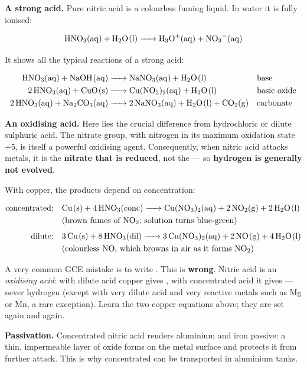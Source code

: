 \documentclass[11pt]{article}
\newcommand{\cle}[1]{{\popxbold\color{popdark}#1}}
\newcounter{popsec}
\newcounter{popsub}
\newcommand{\courssub}[1]{%
  \stepcounter{popsub}%
  \par\vspace{9pt}\noindent{\popxbold\fontsize{11.5}{13}\selectfont\color{popink}{\color{poporange}\thepopsec.\thepopsub}\hspace{6pt}#1}\par\nopagebreak\vspace{4pt}
}
\begin{document}
\courssub{Properties of Nitric Acid}

\textbf{A strong acid.} Pure nitric acid is a colourless fuming liquid. In water it is fully ionised:

\[ \ce{HNO3(aq) + H2O(l) -> H3O+(aq) + NO3-(aq)} \]

It shows all the typical reactions of a strong acid:

\begin{align*}
\ce{HNO3(aq) + NaOH(aq) &-> NaNO3(aq) + H2O(l)} && \text{base}\\
\ce{2HNO3(aq) + CuO(s) &-> Cu(NO3)2(aq) + H2O(l)} && \text{basic oxide}\\
\ce{2HNO3(aq) + Na2CO3(aq) &-> 2NaNO3(aq) + H2O(l) + CO2(g)} && \text{carbonate}
\end{align*}

\textbf{An oxidising acid.} Here lies the crucial difference from hydrochloric or dilute sulphuric acid. The nitrate group, with nitrogen in its maximum oxidation state $+5$, is itself a powerful oxidising agent. Consequently, when nitric acid attacks metals, it is the \textbf{nitrate that is reduced}, not the  — so \textbf{hydrogen is generally not evolved}.

With copper, the products depend on concentration:

\begin{align*}
\text{concentrated:}\quad & \ce{Cu(s) + 4HNO3(conc) -> Cu(NO3)2(aq) + 2NO2(g) + 2H2O(l)}\\
& \text{(brown fumes of \ce{NO2}; solution turns blue-green)}\\[4pt]
\text{dilute:}\quad & \ce{3Cu(s) + 8HNO3(dil) -> 3Cu(NO3)2(aq) + 2NO(g) + 4H2O(l)}\\
& \text{(colourless \ce{NO}, which browns in air as it forms \ce{NO2})}
\end{align*}

\begin{attention}
A very common GCE mistake is to write . This is \textbf{wrong}. Nitric acid is an \emph{oxidising acid}: with dilute acid copper gives , with concentrated acid it gives  — never hydrogen (except with very dilute acid and very reactive metals such as Mg or Mn, a rare exception). Learn the two copper equations above; they are set again and again.
\end{attention}

\textbf{Passivation.} Concentrated nitric acid renders aluminium and iron \cle{passive}: a thin, impermeable layer of oxide forms on the metal surface and protects it from further attack. This is why concentrated  can be transported in aluminium tanks.
\end{document}
